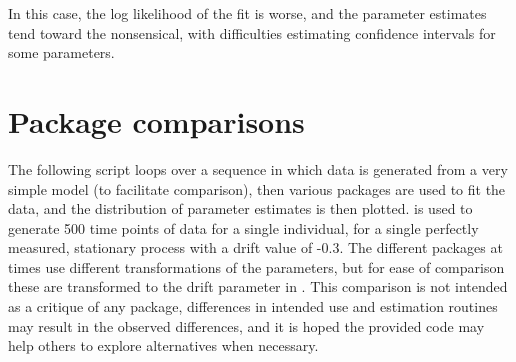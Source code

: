 \documentclass[nojss]{jss}\usepackage[]{graphicx}\usepackage[]{color}
\begin{document}
In this case, the log likelihood of the fit is worse, and the parameter estimates tend toward the nonsensical, with difficulties estimating confidence intervals for some parameters.

\newpage
\section{Package comparisons} \label{app:appendixA}\nopagebreak
The following script loops over a sequence in which data is generated from a very simple model (to facilitate comparison), then various packages are used to fit the data, and the distribution of parameter estimates is then plotted.  is used to generate 500 time points of data for a single individual, for a single perfectly measured, stationary process with a drift value of -0.3. The different packages at times use different transformations of the parameters, but for ease of comparison these are transformed to the drift parameter in . This comparison is not intended as a critique of any package, differences in intended use and estimation routines may result in the observed differences, and it is hoped the provided code  may help others to explore alternatives when necessary.
\end{document}
